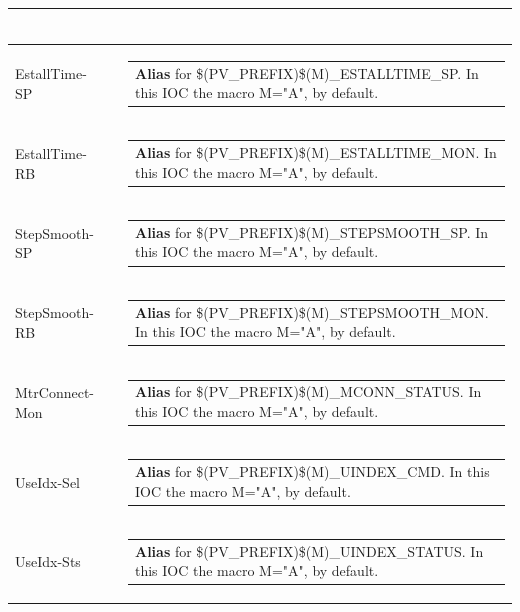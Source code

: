 \documentclass[openany]{article}
\begin{document}
\begin{longtable}{| m{4.5cm} m{2.5cm}  m{8.0cm} |}
\begin{tabular}{@{}m{6cm}@{}}
            \end{tabular} \hypertarget{}{}\\ \hline
        EstallTime-SP &  & \begin{tabular}{@{}m{6cm}@{}}
                \textbf{Alias} for \$(PV\_PREFIX)\$(M)\_ESTALLTIME\_SP. In this IOC the macro M="A", by default.
            \end{tabular} \hypertarget{}{}\\ \hline
        EstallTime-RB &  & \begin{tabular}{@{}m{6cm}@{}}
                \textbf{Alias} for \$(PV\_PREFIX)\$(M)\_ESTALLTIME\_MON. In this IOC the macro M="A", by default.
            \end{tabular} \hypertarget{}{}\\ \hline
        StepSmooth-SP &  & \begin{tabular}{@{}m{6cm}@{}}
                \textbf{Alias} for \$(PV\_PREFIX)\$(M)\_STEPSMOOTH\_SP. In this IOC the macro M="A", by default.
            \end{tabular} \hypertarget{}{}\\ \hline
        StepSmooth-RB &  & \begin{tabular}{@{}m{6cm}@{}}
                \textbf{Alias} for \$(PV\_PREFIX)\$(M)\_STEPSMOOTH\_MON. In this IOC the macro M="A", by default.
            \end{tabular} \hypertarget{}{}\\ \hline
        MtrConnect-Mon &  & \begin{tabular}{@{}m{6cm}@{}}
                \textbf{Alias} for \$(PV\_PREFIX)\$(M)\_MCONN\_STATUS. In this IOC the macro M="A", by default.
            \end{tabular} \hypertarget{}{}\\ \hline
        UseIdx-Sel &  & \begin{tabular}{@{}m{6cm}@{}}
                \textbf{Alias} for \$(PV\_PREFIX)\$(M)\_UINDEX\_CMD. In this IOC the macro M="A", by default.
            \end{tabular} \hypertarget{}{}\\ \hline
        UseIdx-Sts &  & \begin{tabular}{@{}m{6cm}@{}}
                \textbf{Alias} for \$(PV\_PREFIX)\$(M)\_UINDEX\_STATUS. In this IOC the macro M="A", by default.
            \end{tabular} \hypertarget{}{}\\ \hline

\end{longtable}
\end{document}
